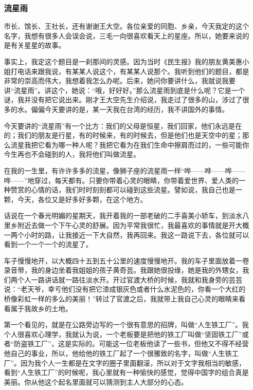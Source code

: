 \subsubsection{流星雨}


\par 市长、馆长、王社长，还有谢谢王大空。各位亲爱的同胞、乡亲，今天我定的这个名字，我想有很多人会误会说，三毛一向很喜欢看天上的星座。所以，她要来说的是有关星星的故事。
\par 事实上，我定这个题目是一刹那间的灵感。因为当时《民生报》我的朋友黄美惠小姐打电话来跟我说，有某某人说这个，有某某人说那个。我听到他们的题目，都是非常的崇高而伟大，我想着我怎么办呢。后来，她问你要讲什么，我就说我要讲“流星雨”。讲这个，她说：“哦，好好好。”那么流星雨到底是什么呢？它是一个谜，我并没有把它说出来。刚才王大空先生介绍说，我走过了很多的山，涉过了很多的水。偏偏今天要讲的是，某一天我在台湾的经历，我不讲国外的事情。
\par 今天要讲的“流星雨”有一个比方：我们的父母是恒星，我们回家，他们永远是在的；我们的朋友是行星，有的时候来，有的时候去，但是他们也是天空中的星；那么流星我把它看为哪一种人呢？我把它看为在我们生命中擦肩而过的，一些可能你今生再也不会碰到的人，我将他们叫做流星。
\par 在我的一生里，有许许多多的流星，像狮子座的流星雨一样“哗——哗——哗——哗——”地穿过，每天都有。只要你带着心灵的眼睛，你带着爱世界、爱人类的一种赞赏的心情的话，我们时时刻刻都可以碰到这些流星。譬如说，我自己也是一颗，今天，各位又是好多好多颗，在这个地方。
\par 话说在一个春光明媚的星期天，我开着我的一部老破的二手喜美小轿车，到淡水八里乡附近去做一个下午心灵的舒展。因为平常我很忙，我最喜欢的事情就是开大概一两个小时的路，让我接近一下大自然，我再回来。我这一路说下去，各位就可以看到一个一个一个的流星了。
\par 车子慢慢地开，以大概四十五到五十公里的速度慢慢地开。我的车子里面放着一卷录音带，我的身边坐着我姐姐的孩子黄奇芸。我跟她很投缘，她是我的外甥女，我们两个人一路讲话就一路往淡水开。开过官渡大桥的时候，我就和我身旁的芸芸说：“老天爷，幸亏他们没有把它漆成银灰色或者什么水泥色的，你看一个大红的桥像彩虹一样的多么的美丽！”转过了官渡之后，我就带上我自己心灵的眼睛来看看属于我故乡的土地。
\par 第一个看见的，就是在公路旁边写的一个很有意思的招牌，叫做“人生铁工厂”。我个人很喜欢心理学，我就认为说，一个老板要是把他的铁工厂叫做“坚固铁工厂”或者“防盗铁工厂”，这是实际的。可能这一位老板他读了一些书，但他又不得不经营他自己的事业，所以，他给他的铁工厂起了一个很雅致的名字，叫做“人生铁工厂”。因为我个人一生都是在文字的圈子里面翻滚，所以对于文字我相当的敏感，看到“人生铁工厂”的时候呢，我心里就有一种愉快的感觉，觉得中国字的组合真是美丽。你从他这个起名里面就可以猜测到主人大部分的心态。
